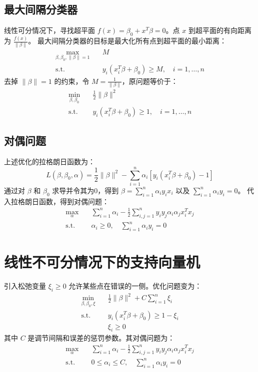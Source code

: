 \documentclass[UTF8]{ctexart}
\begin{document}
\subsection{最大间隔分类器}
线性可分情况下，寻找超平面 $f(x) = \beta_0 + x^T\beta = 0$。点 $x$ 到超平面的有向距离为 $\frac{f(x)}{\|\beta\|}$。
最大间隔分类器的目标是最大化所有点到超平面的最小距离：
\begin{align*}
\max_{\beta, \beta_0, \|\beta\|=1} & \quad M \\
\text{s.t.} & \quad y_i(x_i^T\beta + \beta_0) \ge M, \quad i=1,\ldots,n
\end{align*}
去掉 $\|\beta\|=1$ 的约束，令 $M = \frac{1}{\|\beta\|}$，原问题等价于：
\begin{align*}
\min_{\beta, \beta_0} & \quad \frac{1}{2}\|\beta\|^2 \\
\text{s.t.} & \quad y_i(x_i^T\beta + \beta_0) \ge 1, \quad i=1,\ldots,n
\end{align*}

\subsection{对偶问题}
上述优化的拉格朗日函数为：
$$ L(\beta, \beta_0, \alpha) = \frac{1}{2}\|\beta\|^2 - \sum_{i=1}^n \alpha_i [y_i(x_i^T\beta + \beta_0) - 1] $$
通过对 $\beta$ 和 $\beta_0$ 求导并令其为0，得到 $\beta = \sum_{i=1}^n \alpha_i y_i x_i$ 以及 $\sum_{i=1}^n \alpha_i y_i = 0$。
代入拉格朗日函数，得到对偶问题：
\begin{align*}
\max_{\alpha} & \quad \sum_{i=1}^n \alpha_i - \frac{1}{2}\sum_{i,j=1}^n y_i y_j \alpha_i \alpha_j x_i^T x_j \\
\text{s.t.} & \quad \alpha_i \ge 0, \quad \sum_{i=1}^n \alpha_i y_i = 0
\end{align*}

\section{线性不可分情况下的支持向量机}
引入松弛变量 $\xi_i \ge 0$ 允许某些点在错误的一侧。优化问题变为：
\begin{align*}
\min_{\beta, \beta_0, \xi} & \quad \frac{1}{2}\|\beta\|^2 + C \sum_{i=1}^n \xi_i \\
\text{s.t.} & \quad y_i(x_i^T\beta + \beta_0) \ge 1 - \xi_i \\
& \quad \xi_i \ge 0
\end{align*}
其中 $C$ 是调节间隔和误差的惩罚参数。其对偶问题为：
\begin{align*}
\max_{\alpha} & \quad \sum_{i=1}^n \alpha_i - \frac{1}{2}\sum_{i,j=1}^n y_i y_j \alpha_i \alpha_j x_i^T x_j \\
\text{s.t.} & \quad 0 \le \alpha_i \le C, \quad \sum_{i=1}^n \alpha_i y_i = 0
\end{align*}
\end{document}
